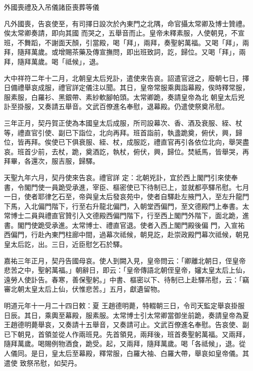 
\begin{pinyinscope}

 外國喪禮及入吊儀諸臣喪葬等儀



 凡外國喪，告哀使至，有司擇日設次於內東門之北隅，命官攝太常卿及博士贊禮。俟太常卿奏請，即向其國
 而哭之，五舉音而止。皇帝未釋素服，人使朝見，不宣班，不舞蹈，不謝面天顏，引當殿，喝「拜」，兩拜，奏聖躬萬福。又喝「拜」，兩拜，隨拜萬歲。或增賜茶藥及傳宣撫問，即出班致詞，訖，歸位。又喝「拜」，兩拜，隨拜萬歲。喝「祗候」，退。



 大中祥符二年十二月，北朝皇太后兇訃，遣使來告哀。詔遣官迓之，廢朝七日，擇日備禮舉哀成服，禮官詳定儀注以聞。其日，皇帝常服乘輿詣幕殿，俟時釋常服，服素服，白羅衫、黑銀帶、素紗軟腳帕頭。太常卿跪，奏請皇帝為北
 朝皇太后兇訃至掛服，又奏請五舉音。文武百僚進名奉慰，退幕殿。仍遣使祭奠吊慰。



 三年正月，契丹賀正使為本國皇太后成服，所司設幕次、香、酒及衰服、絰、杖等，禮直官引使、副已下詣位，北向再拜。班首詣前，執盞跪奠，俯伏，興，歸位，皆再拜。俟使已下俱衰服、絰、杖，成服訖，禮直官再引各依位北向，舉哭盡哀。班首少前，去杖，跪，奠酒訖，執杖，俯伏，興，歸位。焚紙馬，皆舉哭，再拜畢，各還次，服吉服，歸驛。



 天聖九年六月，契丹使來告哀。禮官詳
 定：北朝兇訃，宜於西上閣門引來使奉書，令閣門使一員跪受承進，宰臣、樞密使已下待制已上，並就都亭驛吊慰。七月一日，使者耶律乞石至，帝與皇太后發哀苑中，使者自驛赴左掖門入，至左升龍門下馬，入北偏門階下，行至右升龍北偏門，入朝堂西偏門，至文德殿門上奉書。太常博士二員與禮直官贊引入文德殿西偏門階下，行至西上閣門外階下，面北跪，進書。閣門使跪受承進。太常博士、禮直官退。使者入西上閣門殿後偏
 門，入宣祐西偏門，行赴內東門柱廊中間，過幕次祗候，朝見訖，赴崇政殿門幕次祗候，朝見皇太后訖，出。三日，近臣慰乞石於驛。



 嘉祐三年正月，契丹告國母哀。使人到闕入見，皇帝問云：「卿離北朝日，侄皇帝悲苦之中，聖躬萬福。」朝辭日，即云：「皇帝傳語北朝侄皇帝，嬸太皇太后上仙，遠勞人使訃告。春寒，善保聖躬。」中書、樞密以下、待制已上赴驛吊慰，云：「竊審北朝太皇太后上仙，伏惟悲苦。」五月，獻遺留物。



 明道元年十一月二十四日敕：夏
 王趙德明薨，特輟朝三日，令司天監定舉哀掛服日辰。其日，乘輿至幕殿，服素服。太常博士引太常卿當御坐前跪，奏請皇帝為夏王趙德明薨舉哀，又奏請十五舉音，又奏請可止。文武百僚進名奉慰。告哀使、副已下朝見，首領並從人作兩班見。先首領見，兩拜後，班首奏聖躬萬福。又兩拜，隨拜萬歲。喝賜例物酒食，跪受。起，又兩拜，隨拜萬歲。喝「各祗候」，退。從人儀同。是日，皇太后至幕殿，釋常服，白羅大袖、白羅大帶，舉哀如皇帝儀。其遣使
 致祭吊慰，如契丹。




\end{pinyinscope}

